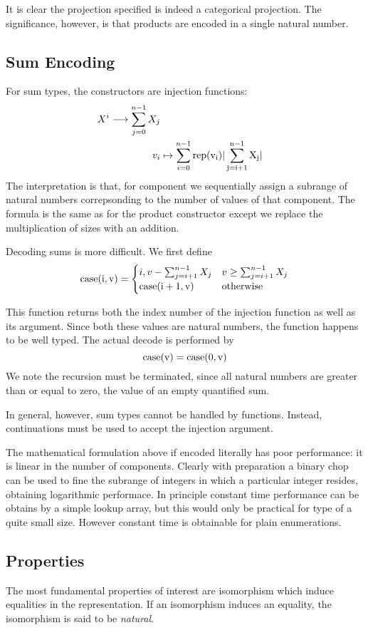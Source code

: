 \documentclass{article}
\begin{document}
It is clear the projection specified is indeed a categorical projection.
The significance, however, is that products are encoded in a single natural
number.

\subsection{Sum Encoding}
For sum types, the constructors are injection functions:
\begin{align*}
X^i\longrightarrow \sum_{j=0}^{n-1}X_j\\
v_i &\mapsto \sum_{i=0}^{n-1}\rm{rep}(v_i) | \sum_{j=i+1}^{n-1} X_j|
\end{align*}
The interpretation is that, for component we sequentially assign a subrange
of natural numbers correpsonding to the number of values of that component.
The formula is the same as for the product constructor except we replace
the multiplication of sizes with an addition.

Decoding sums is more difficult. We first define
$$
\rm{case} (i,v) = \begin{cases}
  i, v - \sum_{j=i+1}^{n-1}X_j& v \ge \sum_{j=i+1}^{n-1}X_j\\
  \rm{case} (i+1,v) & \text{otherwise}
\end{cases}
$$

This function returns both the index number of the injection function
as well as its argument. Since both these values are natural numbers,
the function happens to be well typed. The actual decode is performed by
$$\rm{case} (v) = \rm{case}(0,v)$$
We note the recursion must be terminated, since all natural numbers are
greater than or equal to zero, the value of an empty quantified sum.

In general, however, sum types cannot be handled by functions. Instead,
continuations must be used to accept the injection argument.

The mathematical formulation above if encoded literally has poor performance:
it is linear in the number of components. Clearly with preparation a binary chop
can be used to fine the subrange of integers in which a particular integer resides,
obtaining logarithmic performace. In principle constant time performance can
be obtains by a simple lookup array, but this would only be practical for
type of a quite small size. However constant time is obtainable for plain
enumerations.

\subsection{Properties}
The most fundamental properties of interest are isomorphism which
induce equalities in the representation. If an isomorphism induces
an equality, the isomorphism is said to be {\em natural}.
\end{document}

